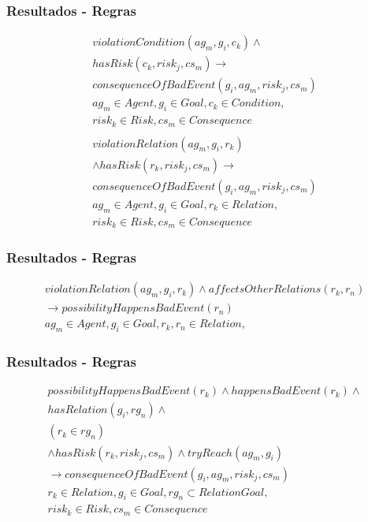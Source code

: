 \documentclass{beamer}
\begin{document}
\begin{frame}
	\frametitle{Resultados - Regras}
	\begin{eqnarray}\label{consviolationcondition}\nonumber
		violationCondition(ag_m,g_i,c_k)  \wedge  \nonumber \\ 
		hasRisk(c_k,risk_j,cs_m) \to \nonumber \\ 
		consequenceOfBadEvent(g_i,ag_m,risk_j,cs_m) \nonumber \\ 
	    ag_m \in Agent, g_i \in Goal, c_k \in Condition, \nonumber \\ 
	    risk_k \in Risk, cs_m \in Consequence \nonumber \\
	\end{eqnarray}
	\begin{eqnarray}\label{consviolationrelation}\nonumber
		violationRelation(ag_m,g_i,r_k) \nonumber \\
		\wedge hasRisk(r_k,risk_j,cs_m) \to \\ 
		consequenceOfBadEvent(g_i,ag_m,risk_j,cs_m) \nonumber \\ 
	    ag_m \in Agent, g_i \in Goal, r_k \in Relation, \nonumber \\
	    risk_k \in Risk, cs_m \in Consequence 
	\end{eqnarray}
\end{frame}
\begin{frame}
	\frametitle{Resultados - Regras}
	\begin{eqnarray}\label{violationentityaffect}
		violationRelation(ag_m,g_i,r_k) \wedge affectsOtherRelations(r_k,r_n) \nonumber \\
	    \to possibilityHappensBadEvent(r_n)  \nonumber \\
	    ag_m \in Agent, g_i \in Goal, r_k,r_n \in Relation, 
	\end{eqnarray}	
\end{frame}
\begin{frame}
	\frametitle{Resultados - Regras}
	\begin{eqnarray}\label{paybutiamnotguilty}
		possibilityHappensBadEvent(r_k) \wedge  happensBadEvent(r_k) \wedge \nonumber \\
		hasRelation(g_i,rg_n) \wedge \nonumber \\
		(r_k \in rg_n) \nonumber \\ 
		\wedge hasRisk(r_k,risk_j,cs_m) \wedge tryReach(ag_m,g_i) \nonumber \\ 
		\to consequenceOfBadEvent(g_i,ag_m,risk_j,cs_m) \nonumber \\ 
	    r_k \in Relation, g_i \in Goal, rg_n \subset RelationGoal, \nonumber \\
	     risk_k \in Risk, cs_m \in Consequence
	\end{eqnarray}
\end{frame}
\end{document}
